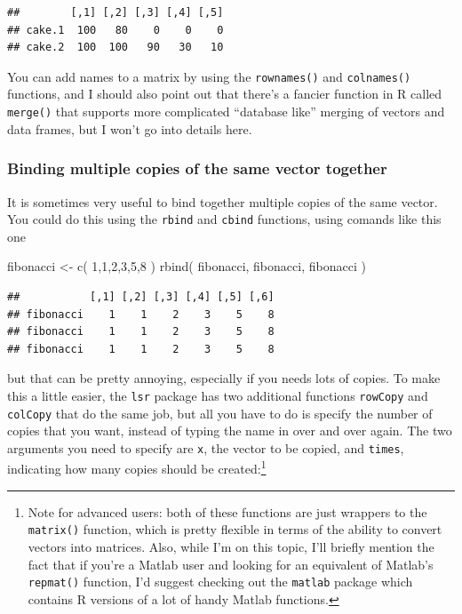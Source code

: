 \documentclass[
]{book}
\newenvironment{Shaded}{\begin{snugshade}}{\end{snugshade}}
\newcommand{\DecValTok}[1]{\textcolor[rgb]{0.00,0.00,0.81}{#1}}
\newcommand{\FunctionTok}[1]{\textcolor[rgb]{0.00,0.00,0.00}{#1}}
\newcommand{\NormalTok}[1]{#1}
\newcommand{\OtherTok}[1]{\textcolor[rgb]{0.56,0.35,0.01}{#1}}
\begin{document}
\begin{verbatim}
##        [,1] [,2] [,3] [,4] [,5]
## cake.1  100   80    0    0    0
## cake.2  100  100   90   30   10
\end{verbatim}

You can add names to a matrix by using the \texttt{rownames()} and \texttt{colnames()} functions, and I should also point out that there's a fancier function in R called \texttt{merge()} that supports more complicated ``database like'' merging of vectors and data frames, but I won't go into details here.

\hypertarget{binding-multiple-copies-of-the-same-vector-together}{%
\subsubsection{Binding multiple copies of the same vector together}\label{binding-multiple-copies-of-the-same-vector-together}}

It is sometimes very useful to bind together multiple copies of the same vector. You could do this using the \texttt{rbind} and \texttt{cbind} functions, using comands like this one

\begin{Shaded}
\begin{Highlighting}[]
\NormalTok{fibonacci }\OtherTok{\textless{}{-}} \FunctionTok{c}\NormalTok{( }\DecValTok{1}\NormalTok{,}\DecValTok{1}\NormalTok{,}\DecValTok{2}\NormalTok{,}\DecValTok{3}\NormalTok{,}\DecValTok{5}\NormalTok{,}\DecValTok{8}\NormalTok{ )}
\FunctionTok{rbind}\NormalTok{( fibonacci, fibonacci, fibonacci )}
\end{Highlighting}
\end{Shaded}

\begin{verbatim}
##           [,1] [,2] [,3] [,4] [,5] [,6]
## fibonacci    1    1    2    3    5    8
## fibonacci    1    1    2    3    5    8
## fibonacci    1    1    2    3    5    8
\end{verbatim}

but that can be pretty annoying, especially if you needs lots of copies. To make this a little easier, the \texttt{lsr} package has two additional functions \texttt{rowCopy} and \texttt{colCopy} that do the same job, but all you have to do is specify the number of copies that you want, instead of typing the name in over and over again. The two arguments you need to specify are \texttt{x}, the vector to be copied, and \texttt{times}, indicating how many copies should be created:\footnote{Note for advanced users: both of these functions are just wrappers to the \texttt{matrix()} function, which is pretty flexible in terms of the ability to convert vectors into matrices. Also, while I'm on this topic, I'll briefly mention the fact that if you're a Matlab user and looking for an equivalent of Matlab's \texttt{repmat()} function, I'd suggest checking out the \texttt{matlab} package which contains R versions of a lot of handy Matlab functions.}
\end{document}
